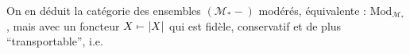 On en déduit la catégorie des ensembles  $(\mathcal M_*-)$ modérés, équivalente : $\mathrm{Mod}_{\mathcal M_*}$, mais avec un foncteur
\qquad$X\mathrel{\mapstochar\relbar}|X|$
qui est fidèle, conservatif et de plus ``transportable'', i.e.
